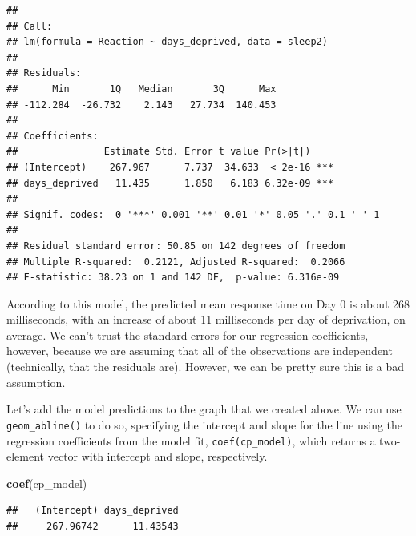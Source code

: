 \documentclass[]{book}
\newenvironment{Shaded}{\begin{snugshade}}{\end{snugshade}}
\newcommand{\KeywordTok}[1]{\textcolor[rgb]{0.13,0.29,0.53}{\textbf{#1}}}
\newcommand{\NormalTok}[1]{#1}
\begin{document}
\begin{verbatim}
## 
## Call:
## lm(formula = Reaction ~ days_deprived, data = sleep2)
## 
## Residuals:
##      Min       1Q   Median       3Q      Max 
## -112.284  -26.732    2.143   27.734  140.453 
## 
## Coefficients:
##               Estimate Std. Error t value Pr(>|t|)    
## (Intercept)    267.967      7.737  34.633  < 2e-16 ***
## days_deprived   11.435      1.850   6.183 6.32e-09 ***
## ---
## Signif. codes:  0 '***' 0.001 '**' 0.01 '*' 0.05 '.' 0.1 ' ' 1
## 
## Residual standard error: 50.85 on 142 degrees of freedom
## Multiple R-squared:  0.2121,	Adjusted R-squared:  0.2066 
## F-statistic: 38.23 on 1 and 142 DF,  p-value: 6.316e-09
\end{verbatim}

According to this model, the predicted mean response time on Day 0 is about 268 milliseconds, with an increase of about 11 milliseconds per day of deprivation, on average. We can't trust the standard errors for our regression coefficients, however, because we are assuming that all of the observations are independent (technically, that the residuals are). However, we can be pretty sure this is a bad assumption.

Let's add the model predictions to the graph that we created above. We can use \texttt{geom\_abline()} to do so, specifying the intercept and slope for the line using the regression coefficients from the model fit, \texttt{coef(cp\_model)}, which returns a two-element vector with intercept and slope, respectively.

\begin{Shaded}
\begin{Highlighting}[]
\KeywordTok{coef}\NormalTok{(cp_model)}
\end{Highlighting}
\end{Shaded}

\begin{verbatim}
##   (Intercept) days_deprived 
##     267.96742      11.43543
\end{verbatim}
\end{document}

